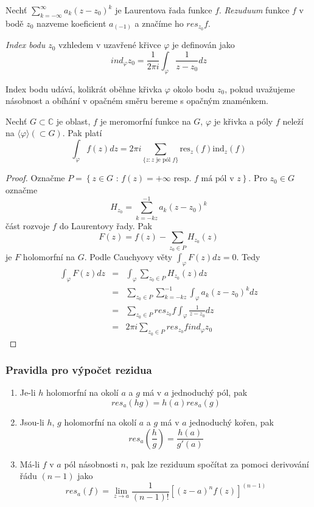 \begin{definice}
Nechť $\sum_{k =- \infty}^\infty a_k ( z-z_0)^k$ je Laurentova řada funkce $f$. \emph{Rezuduum} funkce $f$ v bodě $z_0$ nazveme koeficient $a_{(-1)}$ a značíme ho $res_{z_0} f$.
\end{definice}

\begin{definice}
\emph{Index bodu $z_0$} vzhledem v uzavřené křivce $\varphi$ je definován jako
$$ind_\varphi z_0 = \frac{1}{2 \pi i} \int_\varphi \frac{1}{z-z_0}dz$$
\end{definice}

Index bodu udává, kolikrát oběhne křivka $\varphi$ okolo bodu $z_0$, pokud uvažujeme násobnost a obíhání v opačném směru bereme s opačným znaménkem.

\begin{vetat}
Nechť $G \subset \mathbb{C}$ je oblast, $f$ je meromorfní funkce na $G$, $\varphi$ je křivka a póly $f$ neleží na $\langle \varphi \rangle (\subset G)$. Pak platí
$$\int_\varphi f(z) dz = 2 \pi i \sum_{\{z: z \textrm{ je pól } f\}} \mathrm{res}_z (f) \mathrm{ind}_z (f)$$
\end{vetat}

\begin{proof}
Označme $P = \left\{ z \in G \textrm{ : } f(z)=+\infty \textrm{ resp. $f$ má pól v $z$} \right\}$. 
Pro $z_0 \in G$ označme 
$$H_{z_0} = \sum_{k = -kz}^{-1} a_k (z-z_0)^k$$ 
část rozvoje $f$ do Laurentovy řady.
Pak $$F(z) = f(z) - \sum_{z_0 \in P} H_{z_0}(z)$$ je $F$ holomorfní na $G$.
Podle Cauchyovy věty $\int_\varphi F(z) dz = 0$. Tedy
\begin{eqnarray*}
\int_\varphi F(z) dz & = & \int_\varphi \sum_{z_0 \in P} H_{z_0}(z) dz \\
& = & \sum_{z_0 \in P} \sum_{k=-kz}^{-1} \int_\varphi a_k (z-z_0)^k dz \\
& = & \sum_{z_0 \in P} res_{z_0} f \int_\varphi \frac{1}{z-z_0} dz \\
& = & 2 \pi i \sum_{z_0 \in P} res_{z_0} f ind_\varphi z_0 
\end{eqnarray*}
\end{proof}

\subsubsection*{Pravidla pro výpočet rezidua}

\begin{enumerate}
\item Je-li $h$ holomorfní na okolí $a$ a $g$ má v $a$ jednoduchý pól, pak
$$res_a(hg) = h(a) res_a (g)$$
\item Jsou-li $h$, $g$ holomorfní na okolí $a$ a $g$ má v $a$ jednoduchý kořen, pak 
$$res_a \left( \frac{h}{g} \right) = \frac{h(a)}{g \prime (a)}$$
\item Má-li $f$ v $a$ pól násobnosti $n$, pak lze reziduum spočítat za pomoci derivování řádu $(n-1)$ jako
$$res_a(f) = \lim_{z \rightarrow a} \frac{1}{(n-1)!} \left[ (z-a)^n f(z) \right]^{(n-1)}$$
\end{enumerate}

